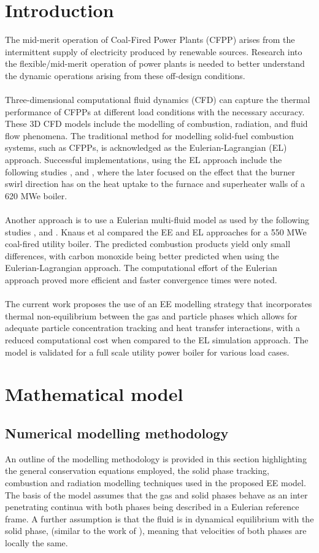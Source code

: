\documentclass{webofc}
\begin{document}
\section{Introduction}
\label{intro}
The mid-merit operation of Coal-Fired Power Plants (CFPP) arises from the intermittent supply of electricity produced by renewable sources. Research into the flexible/mid-merit operation of power plants is needed to better understand the dynamic operations arising from these off-design conditions.\\
\\
Three-dimensional computational fluid dynamics (CFD) can capture the thermal performance of CFPPs at different load conditions with the necessary accuracy. These 3D CFD models include the modelling of combustion, radiation, and fluid flow phenomena. The traditional method for modelling
solid-fuel combustion systems, such as CFPPs, is acknowledged as the Eulerian-Lagrangian (EL) approach. Successful implementations, using the EL approach include the following studies \cite{bohnstein},\cite{laubscher_1} and \cite{laubscher_2}, where the later focused on the effect that the burner swirl direction has on the heat uptake to the furnace and superheater walls of a 620 MWe boiler.\\
\\
Another approach is to use a Eulerian multi-fluid model as used by the following studies \cite{epple}, \cite{cai} and \cite{wu}. Knaus et al \cite{knaus} compared the EE and EL approaches for a 550 MWe coal-fired utility boiler. The predicted combustion products yield only small differences, with carbon monoxide being better predicted when using the Eulerian-Lagrangian approach. The computational effort of the Eulerian approach proved more efficient and faster convergence times were noted.\\
\\
The current work proposes the use of an EE modelling strategy that incorporates thermal non-equilibrium between the gas and particle phases which allows for adequate particle concentration tracking and heat transfer interactions, with a reduced computational cost when compared to the EL simulation approach. The model is validated for a full scale utility power boiler for various load cases.

\section{Mathematical model} \label{Theory}
\subsection{Numerical modelling methodology}
An outline of the modelling methodology is provided in this section highlighting the general conservation equations employed, the solid phase tracking, combustion and radiation modelling techniques used in the proposed EE model. The basis of the model assumes that the gas and solid phases behave as an inter penetrating continua with both phases being described in a Eulerian reference frame. A further assumption is that the fluid is in dynamical equilibrium with the solid phase, (similar to the work of \cite{epple}), meaning that velocities of both phases are locally the same.
\end{document}
